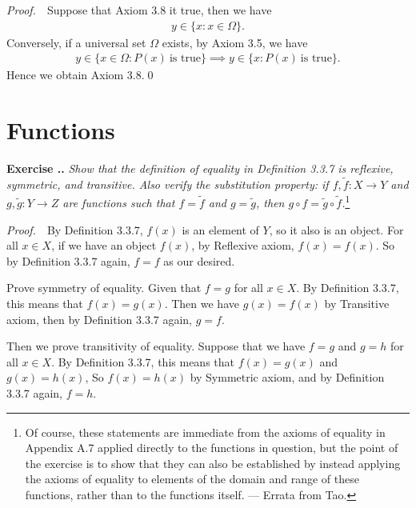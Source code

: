 \documentclass{book}
\newcommand{\pff}{\vspace{.25em}\noindent\emph{Proof.}~~}
\newcounter{Exercise}[section]
\renewcommand{\theExercise}{\thesection.\arabic{Exercise}.}
\newcommand{\new}{\vspace{1.5em}\noindent\textbf{{Exercise \stepcounter{Exercise}\textbf{\theExercise}}} }
\begin{document}
\pff Suppose that Axiom 3.8 it true, then we have
    \begin{align*}
        y\in\{x:x\in\Omega\}.
    \end{align*}
Conversely, if a universal set $\Omega$ exists, by Axiom 3.5, we have
    \begin{align*}
        y\in\{x\in\Omega:P(x)\ \textrm{is true}\}\implies y\in\{x:P(x)\ \textrm{is true}\}.
    \end{align*}
Hence we obtain Axiom 3.8.\qed
\section{Functions}

\begin{comment}
\new\emph{We observe that functions obey the axiom of substitution: if $x=x'$, then $f(x)=f(x')$ (why? p.50).}

\pff By Definition 3.3.1, there is an unique object $f(x)$ for which $P(x,f(x))$ is true. If $f(x)\neq f(x')$ for some object $x$, then both of $P(x,f(x))$ and $P(x,f(x'))$ are true. This is an contradiction.\qed
\end{comment}
\new\emph{Show that the definition of equality in Definition 3.3.7 is reflexive, symmetric, and transitive. Also verify the substitution property: if $f,\tilde{f}:X\to Y$ and $g,\tilde{g}:Y\to Z$ are functions such that $f=\tilde{f}$ and $g=\tilde{g}$, then $g\circ f=\tilde{g}\circ\tilde{f}$.}\footnote{Of course, these statements are immediate from the axioms of equality in Appendix A.7 applied directly to the functions in question, but the point of the exercise is to show that they can also be established by instead applying the axioms of equality to elements of the domain and range of these functions, rather than to the functions itself. --- Errata from Tao.}

\pff By Definition 3.3.7, $f(x)$ is an element of $Y$, so it also is an object. For all $x\in X$, if we have an object $f(x)$, by Reflexive axiom, $f(x)=f(x)$. So by Definition 3.3.7 again, $f=f$ as our desired.

Prove symmetry of equality. Given that $f=g$ for all $x\in X$. By Definition 3.3.7, this means that $f(x)=g(x)$. Then we have $g(x)=f(x)$ by Transitive axiom, then by Definition 3.3.7 again, $g=f$.

Then we prove transitivity of equality. Suppose that we have $f=g$ and $g=h$ for all $x\in X$. By Definition 3.3.7, this means that $f(x)=g(x)$ and $g(x)=h(x)$, So $f(x)=h(x)$ by Symmetric axiom, and by Definition 3.3.7 again, $f=h$.
\end{document}
